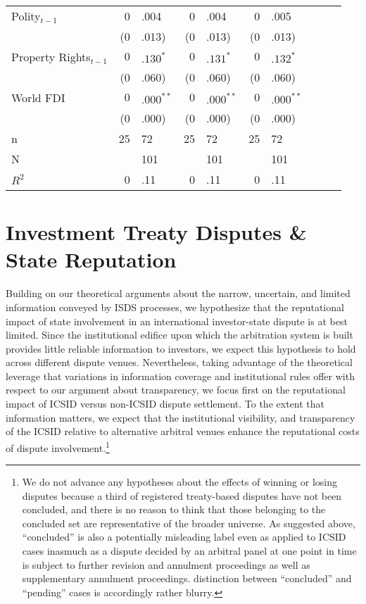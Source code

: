 \documentclass[12pt,onesided]{amsart}
\begin{document}
\begin{table}[ht]
{\begin{tabular}{lr@{} lr@{}lr@{}lr@{}lr@{}}
  Polity$_{t-1}$ & 0&.004 & 0&.004 & 0&.005 \\ 
   & (0&.013) & (0&.013) & (0&.013) \\ 
  Property Rights$_{t-1}$ & $0$&$.130^{\ast}$ & $0$&$.131^{\ast}$ & $0$&$.132^{\ast}$ \\ 
   & (0&.060) & (0&.060) & (0&.060) \\ 
  World FDI & $0$&$.000^{\ast\ast}$ & $0$&$.000^{\ast\ast}$ & $0$&$.000^{\ast\ast}$ \\ 
   & (0&.000) & (0&.000) & (0&.000) \\ 
   \hline
n & 25&72 & 25&72 & 25&72 \\ 
  N && 101 && 101 && 101 \\ 
  $R^{2}$ & 0&.11 & 0&.11 & 0&.11 \\ 
   \hline
\hline
\end{tabular}
}
\end{table}

\section*{Investment Treaty Disputes \& State Reputation}

Building on our theoretical arguments about the narrow, uncertain, and limited information conveyed by ISDS processes, we hypothesize that the reputational impact of state involvement in an international investor-state dispute is at best limited. Since the institutional edifice upon which the arbitration system is built provides little reliable information to investors, we expect this hypothesis to hold across different dispute venues. Nevertheless, taking advantage of the theoretical leverage that variations in information coverage and institutional rules offer with respect to our argument about transparency, we focus first on the reputational impact of ICSID versus non-ICSID dispute settlement. To the extent that information matters, we expect that the institutional visibility, and transparency of the ICSID relative to alternative arbitral venues enhance the reputational costs of dispute involvement.\footnote{We do not advance any hypotheses about the effects of winning or losing disputes because a third of registered treaty-based disputes have not been concluded, and there is no reason to think that those belonging to the concluded set are representative of the broader universe. As suggested above, ``concluded'' is also a potentially misleading label even as applied to ICSID cases inasmuch as a dispute decided by an arbitral panel at one point in time is subject to further revision and annulment proceedings as well as supplementary annulment proceedings. distinction between ``concluded'' and ``pending'' cases is accordingly rather blurry.}
\end{document}
